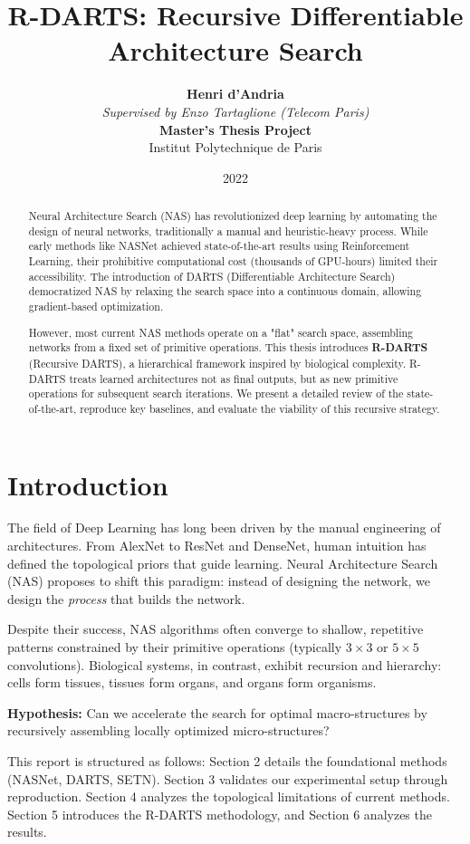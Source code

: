 \documentclass[a4paper,11pt]{article}
\title{\textbf{R-DARTS: Recursive Differentiable Architecture Search}}
\author{\textbf{Henri d'Andria} \\
\textit{Supervised by Enzo Tartaglione (Telecom Paris)} \\
\textbf{Master's Thesis Project} \\
Institut Polytechnique de Paris}
\date{2022}
\begin{document}
\maketitle

\begin{abstract}
Neural Architecture Search (NAS) has revolutionized deep learning by automating the design of neural networks, traditionally a manual and heuristic-heavy process. While early methods like NASNet achieved state-of-the-art results using Reinforcement Learning, their prohibitive computational cost (thousands of GPU-hours) limited their accessibility. The introduction of DARTS (Differentiable Architecture Search) democratized NAS by relaxing the search space into a continuous domain, allowing gradient-based optimization.

However, most current NAS methods operate on a "flat" search space, assembling networks from a fixed set of primitive operations. This thesis introduces \textbf{R-DARTS} (Recursive DARTS), a hierarchical framework inspired by biological complexity. R-DARTS treats learned architectures not as final outputs, but as new primitive operations for subsequent search iterations. We present a detailed review of the state-of-the-art, reproduce key baselines, and evaluate the viability of this recursive strategy.
\end{abstract}

\section{Introduction}
The field of Deep Learning has long been driven by the manual engineering of architectures. From AlexNet to ResNet and DenseNet, human intuition has defined the topological priors that guide learning. Neural Architecture Search (NAS) proposes to shift this paradigm: instead of designing the network, we design the \textit{process} that builds the network.

Despite their success, NAS algorithms often converge to shallow, repetitive patterns constrained by their primitive operations (typically $3\times3$ or $5\times5$ convolutions). Biological systems, in contrast, exhibit recursion and hierarchy: cells form tissues, tissues form organs, and organs form organisms.

\textbf{Hypothesis:} Can we accelerate the search for optimal macro-structures by recursively assembling locally optimized micro-structures?

This report is structured as follows: Section 2 details the foundational methods (NASNet, DARTS, SETN). Section 3 validates our experimental setup through reproduction. Section 4 analyzes the topological limitations of current methods. Section 5 introduces the R-DARTS methodology, and Section 6 analyzes the results.
\end{document}
